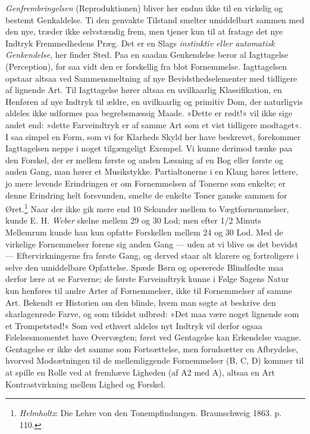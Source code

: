 \documentclass[12pt,a4paper,openany]{book}
\newcommand{\opage}[1]{\marginnote{\footnotesize\textit{[#1]}}}
\begin{document}
\emph{Genfrembringelsen} (Reproduktionen) bliver her endnu ikke til en
virkelig og bestemt Genkaldelse. Ti den genvakte Tilstand smelter
umiddelbart sammen med den nye, træder ikke selvstændig frem, men tjener
kun til at fratage det nye Indtryk Fremmedhedens Præg. Det er en Slags
\emph{instinktiv eller automatisk Genkendelse}, her finder Sted. Paa en
saadan Genkendelse beror al Iagttagelse (Perception), for saa vidt den
er forskellig fra blot Fornemmelse. Iagttagelsen opstaar altsaa ved
Sammensmeltning af nye Bevidsthedselementer med tidligere af lignende
Art. Til Iagttagelse hører altsaa en uvilkaarlig Klassifikation, en
Henføren af nye Indtryk til ældre, en uvilkaarlig og primitiv Dom, der
naturligvis aldeles ikke udformes paa begrebsmæssig Maade. »Dette er
rødt!« vil ikke sige andet end: »dette Farveindtryk er af samme Art som
et vist tidligere modtaget«. I saa simpel en Form, som vi for Klarheds
Skyld her have beskrevet, forekommer Iagttagelsen neppe i noget
tilgængeligt Exempel. Vi kunne derimod tænke paa den Forskel, der er
mellem første og anden Læsning af en Bog eller første og anden Gang, man
hører et Musikstykke. Partialtonerne i en Klang høres lettere, jo mere
levende Erindringen er om Fornemmelsen af Tonerne som enkelte; er denne
Erindring helt forsvunden, smelte de enkelte Toner ganske sammen for
Øret.\footnote[1]{\emph{Helmholtz}: Die Lehre von den Tonempfindungen.
Braunschweig 1863. p. 110.} Naar der ikke gik mere end 10 Sekunder
mellem to Vægtfornemmelser, kunde E. H. \emph{Weber}
\opage{152}skelne mellem 29 og 30 Lod; men efter 1/2 Minuts Mellemrum
kunde han kun opfatte Forskellen mellem 24 og 30 Lod. Med de virkelige
Fornemmelser forene sig anden Gang --- uden at vi blive os det bevidst
--- Eftervirkningerne fra første Gang, og derved staar alt klarere og
fortroligere i selve den umiddelbare Opfattelse. Spæde Børn og opererede
Blindfødte maa derfor lære at se Farverne; de første Farveindtryk kunne
i Følge Sagens Natur kun henføres til andre Arter af Fornemmelser, ikke
til Fornemmelser af samme Art. Bekendt er Historien om den blinde, hvem
man søgte at beskrive den skarlagenrøde Farve, og som tilsidst udbrød:
»Det maa være noget lignende som et Trompetstød!« Som ved ethvert
aldeles nyt Indtryk vil derfor ogsaa Følelsesmomentet have Overvægten;
først ved Gentagelse kan Erkendelse vaagne. Gentagelse er ikke det samme
som Fortsættelse, men forudsætter en Afbrydelse, hvorved Modsætningen
til de mellemliggende Fornemmelser (B, C, D) kommer til at spille en
Rolle ved at fremhæve Ligheden (af A2 med A), altsaa en Art
Kontrastvirkning mellem Lighed og Forskel.
\end{document}
